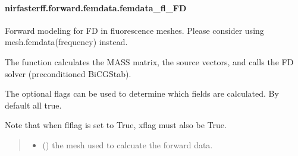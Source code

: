\documentclass[letterpaper,10pt,english]{sphinxmanual}
\begin{document}
\sphinxstepscope


\paragraph{nirfasterff.forward.femdata.femdata\_fl\_FD}
\label{\detokenize{_autosummary/nirfasterff.forward.femdata.femdata_fl_FD:nirfasterff-forward-femdata-femdata-fl-fd}}\label{\detokenize{_autosummary/nirfasterff.forward.femdata.femdata_fl_FD::doc}}

\begin{fulllineitems}
\label{\detokenize{_autosummary/nirfasterff.forward.femdata.femdata_fl_FD:nirfasterff.forward.femdata.femdata_fl_FD}}
\pysigstartsignatures
{}
\pysigstopsignatures
\sphinxAtStartPar
Forward modeling for FD in fluorescence meshes. Please consider using mesh.femdata(frequency) instead.

\sphinxAtStartPar
The function calculates the MASS matrix, the source vectors, and calls the FD solver (preconditioned BiCGStab).

\sphinxAtStartPar
The optional flags can be used to determine which fields are calculated. By default all true.

\sphinxAtStartPar
Note that when flflag is set to True, xflag must also be True.
\begin{quote}\begin{description}
\begin{itemize}
\item {} 
\sphinxAtStartPar
{} () \textendash{} the mesh used to calcuate the forward data.


\end{itemize}
\end{description}
\end{quote}
\end{fulllineitems}
\end{document}
